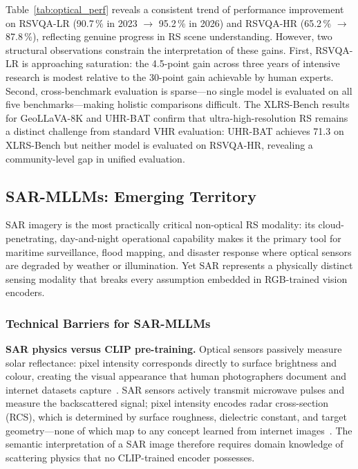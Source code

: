 Table~\ref{tab:optical_perf} reveals a consistent trend of performance
improvement on RSVQA-LR (90.7\,\% in 2023 $\to$ 95.2\,\% in 2026) and
RSVQA-HR (65.2\,\% $\to$ 87.8\,\%), reflecting genuine progress in RS scene
understanding. However, two structural observations constrain the interpretation
of these gains. First, RSVQA-LR is approaching saturation: the 4.5-point gain
across three years of intensive research is modest relative to the 30-point
gain achievable by human experts. Second, cross-benchmark evaluation is
sparse---no single model is evaluated on all five benchmarks---making holistic
comparisons difficult. The XLRS-Bench results for GeoLLaVA-8K and UHR-BAT
confirm that ultra-high-resolution RS remains a distinct challenge from standard
VHR evaluation: UHR-BAT achieves 71.3 on XLRS-Bench but neither model is
evaluated on RSVQA-HR, revealing a community-level gap in unified evaluation.

\subsection{SAR-MLLMs: Emerging Territory}\label{sec5:sar}

SAR imagery is the most practically critical non-optical RS modality: its
cloud-penetrating, day-and-night operational capability makes it the primary
tool for maritime surveillance, flood mapping, and disaster response where
optical sensors are degraded by weather or illumination. Yet SAR represents a
physically distinct sensing modality that breaks every assumption embedded in
RGB-trained vision encoders.

\subsubsection{Technical Barriers for SAR-MLLMs}\label{sec5:sarbarriers}

\textbf{SAR physics versus CLIP pre-training.}
Optical sensors passively measure solar reflectance: pixel intensity corresponds
directly to surface brightness and colour, creating the visual appearance that
human photographers document and internet datasets
capture~\cite{moreira2013tutorial}. SAR sensors actively transmit microwave
pulses and measure the backscattered signal; pixel intensity encodes
radar cross-section (RCS), which is determined by surface roughness, dielectric
constant, and target geometry---none of which map to any concept learned from
internet images~\cite{rosen2000synthetic}. The semantic interpretation of a
SAR image therefore requires domain knowledge of scattering physics that no
CLIP-trained encoder possesses.

